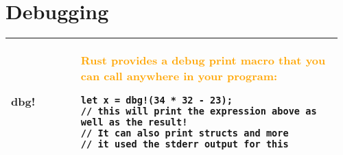 \documentclass[main.tex,fontsize=8pt,paper=a4,paper=portrait,DIV=calc,]{scrartcl}
\begin{document}
\pagebreak
\begin{table}[ht!]
\begin{tabular}{|m{0.2\linewidth}|m{0.755\linewidth}|}
\hline

\hline

\hline

\hline

\hline

\hline

\hline

\hline

\hline

\hline
\end{tabular}
\end{table}
\pagebreak
\begin{table}[ht!]
\begin{tabular}{|m{0.2\linewidth}|m{0.755\linewidth}|}
\hline

\hline

\hline

\hline

\hline

\hline

\hline

\hline

\hline

\hline
\end{tabular}
\end{table}
\pagebreak
\begin{table}[ht!]
\section{Debugging}
\begin{tabular}{|m{0.2\linewidth}|m{0.755\linewidth}|}
\hline
dbg! &
\textcolor{orange}{Rust provides a debug print macro that you can call anywhere in your program:}\newline
\begin{lstlisting}
let x = dbg!(34 * 32 - 23); 
// this will print the expression above as well as the result!
// It can also print structs and more
// it used the stderr output for this
\end{lstlisting}\\
\hline

\hline

\hline

\hline
\end{tabular}
\end{table}
\pagebreak 
\end{document}
